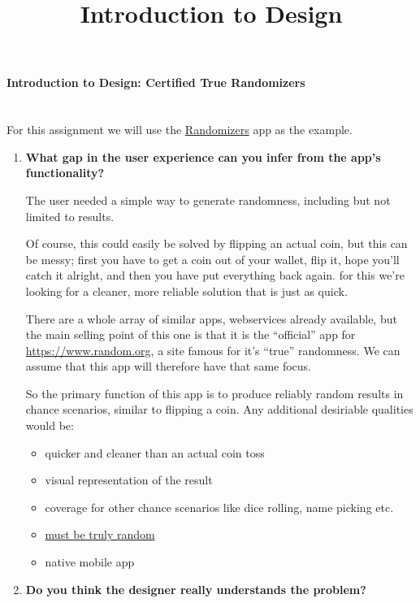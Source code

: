 \title{Introduction to Design}

\paragraph{Introduction to Design: Certified True Randomizers} \hspace{0pt} \\


For this assignment we will use the \href{https://www.random.org/app/}{Randomizers} app as the example.


\begin{enumerate}
  \item \textbf{What gap in the user experience can you infer from the app’s functionality?}

    The user needed a simple way to generate randomness, including but not limited to  results.

    Of course, this could easily be solved by flipping an actual coin, but this can be messy;
    first you have to get a coin out of your wallet, flip it, hope you'll catch it alright, and then you have put everything back again.
    for this we're looking for a cleaner, more reliable solution that is just as quick.

    There are a whole array of similar apps, webservices already available, but the main selling point of this one is that it is the ``official'' app
    for \url{https://www.random.org}, a site famous for it's ``true'' randomness. We can assume that this app will therefore have that same focus.

    So the primary function of this app is to produce reliably random results in  chance scenarios, similar to flipping a coin.
    Any additional desiriable qualities would be:

    \begin{itemize}
      \item quicker and cleaner than an actual coin toss
      \item visual representation of the result
      \item coverage for other chance scenarios like dice rolling, name picking etc.
      \item \href{https://www.xkcd.com/221/}{must be truly random}
      \item native mobile app
    \end{itemize}

  \item \textbf{Do you think the designer really understands the problem?}


\end{enumerate}
